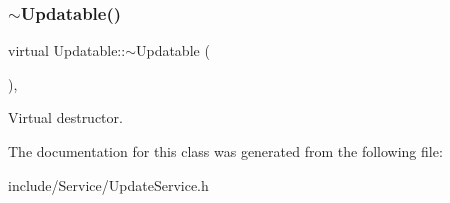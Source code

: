 \subsubsection{\texorpdfstring{$\sim$\+Updatable()}{~Updatable()}}
{\footnotesize\ttfamily virtual Updatable\+::$\sim$\+Updatable (\begin{DoxyParamCaption}{ }\end{DoxyParamCaption})\hspace{0.3cm}{\ttfamily [inline]}, {\ttfamily [virtual]}}

Virtual destructor. 

The documentation for this class was generated from the following file\+:\begin{DoxyCompactItemize}
\item 
include/\+Service/Update\+Service.\+h\end{DoxyCompactItemize}
